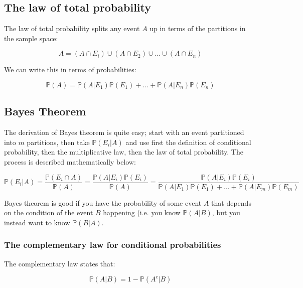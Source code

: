 \subsection{The law of total probability}

The law of total probability splits any event $A$ up in terms of the partitions
in the sample space:

\begin{dmath*}
	A = (A \cap E_i) \cup (A \cap E_2) \cup \dots \cup (A \cap E_n)
\end{dmath*}

We can write this in terms of probabilities:

\begin{dmath*}
	\mathbb{P}(A) = \mathbb{P}(A|E_1)\mathbb{P}(E_1) + \dots + \mathbb{P}(A|E_n)\mathbb{P}(E_n)
\end{dmath*}

\subsection{Bayes Theorem}

The derivation of Bayes theorem is quite easy; start with an event partitioned
into $m$ partitions, then take $\mathbb{P}(E_i|A)$ and use first the definition
of conditional probability, then the multiplicative law, then the law of total
probability. The process is described mathematically below:

\begin{dmath*}
	\mathbb{P}(E_i|A) = \frac{\mathbb{P}(E_i \cap A)}{\mathbb{P}(A)} = \frac{\mathbb{P}(A|E_i)\mathbb{P}(E_i)}{\mathbb{P}(A)} = \frac{\mathbb{P}(A|E_i)\mathbb{P}(E_i)}{\mathbb{P}(A|E_1)\mathbb{P}(E_1) + \dots + \mathbb{P}(A|E_m)\mathbb{P}(E_m)}
\end{dmath*}

Bayes theorem is good if you have the probability of some event $A$ that depends
on the condition of the event $B$ happening (i.e. you know $\mathbb{P}(A|B)$,
but you instead want to know $\mathbb{P}(B|A)$.

\subsubsection{The complementary law for conditional probabilities}

The complementary law states that:

\begin{dmath*}
	\mathbb{P}(A|B) = 1 - \mathbb{P}(A^c|B)
\end{dmath*}

